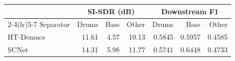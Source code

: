 \begin{tabular}{lrrrrrr}
\toprule
 & \multicolumn{3}{c}{SI-SDR (dB)} & \multicolumn{3}{c}{Downstream F1} \\
\cmidrule(lr){2-4}\cmidrule(lr){5-7}
Separator & Drums & Bass & Other & Drums & Bass & Other \\
\midrule
HT-Demucs & 11.61 & 4.57 & 10.13 & 0.5845 & 0.5957 & 0.4585 \\
SCNet & 14.31 & 5.98 & 11.77 & 0.5741 & 0.6448 & 0.4733 \\
\bottomrule
\end{tabular}
